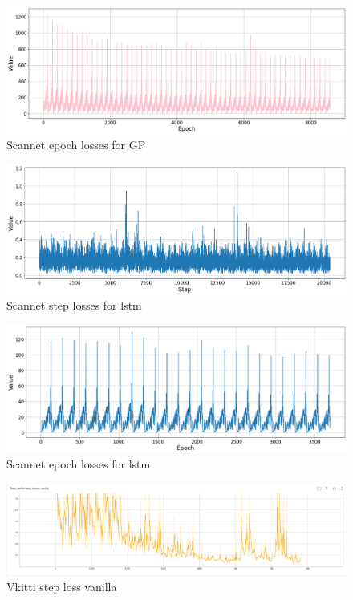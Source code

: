 	\begin{figure}
		\centering
		\includegraphics[width=13cm]{images/scannet_gp_epoch_all.png}
		\caption{Scannet epoch losses for GP}
		\label{fig:android_result}
	\end{figure}

	\begin{figure}
		\centering
		\includegraphics[width=13cm]{images/scannet_step_lstm.png}
		\caption{Scannet step losses for lstm}
		\label{fig:android_result}
	\end{figure}

	\begin{figure}
		\centering
		\includegraphics[width=13cm]{images/scannet_lstm_epoch_all.png}
		\caption{Scannet epoch losses for lstm}
		\label{fig:android_result}
	\end{figure}

	\begin{figure}
		\centering
		\includegraphics[width=13cm]{images/vanilla_step_loss_vkitti.png}
		\caption{Vkitti step loss vanilla}
		\label{fig:android_result}
	\end{figure}

